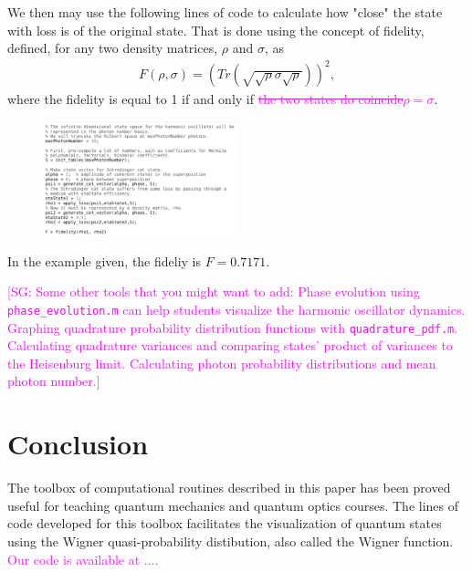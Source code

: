 \documentclass[twocolumn]{rbef}
\providecommand{\aucmnt}[1]{#1}
\providecommand{\editcolor}[2]{\textcolor{#1}{#2}}
\providecommand{\aucmnt}[1]{}
\providecommand{\editcolor}[2]{#2}
\newcommand{\SG}[1]{\editcolor{magenta}{#1}}
\newcommand{\SGs}[1]{\aucmnt{\editcolor{magenta}{\sout{#1}}}}
\newcommand{\SGc}[1]{\aucmnt{\editcolor{magenta}{[SG: #1]}}}
\begin{document}
We then may use the following lines of code to calculate how "close" the state with loss is of the original state. That is done using the concept of fidelity, defined, for any two density matrices, $\rho$ and $\sigma$, as
\begin{eqnarray}
F(\rho,\sigma) = \left( Tr \left(\sqrt{\sqrt{\rho} \sigma \sqrt{\rho}}\right) \right)^2,
\end{eqnarray}
where the fidelity is equal to 1 if and only if \SGs{the two states do coincide}\SG{$\rho=\sigma$}.

\begin{figure}[h!]
\includegraphics[width=0.5\textwidth]{fidelity.eps}
\end{figure}

In the example given, the fideliy is $F = 0.7171$.

\SGc{Some other tools that you might want to add: Phase evolution
  using \texttt{phase\_evolution.m} can help students visualize the
  harmonic oscillator dynamics.  Graphing quadrature probability
  distribution functions with \texttt{quadrature\_pdf.m}.  Calculating
  quadrature variances and comparing states' product of variances to
  the Heisenburg limit.  Calculating photon probability distributions
  and mean photon number.}

\section{Conclusion}
\label{conclusion}
The toolbox of computational routines described in this paper has been
proved useful for teaching quantum mechanics and quantum optics
courses. The lines of code developed for this toolbox facilitates the
visualization of quantum states using the Wigner quasi-probability
distibution, also called the Wigner function. \SG{Our code is
  available at ....}




\end{document}
